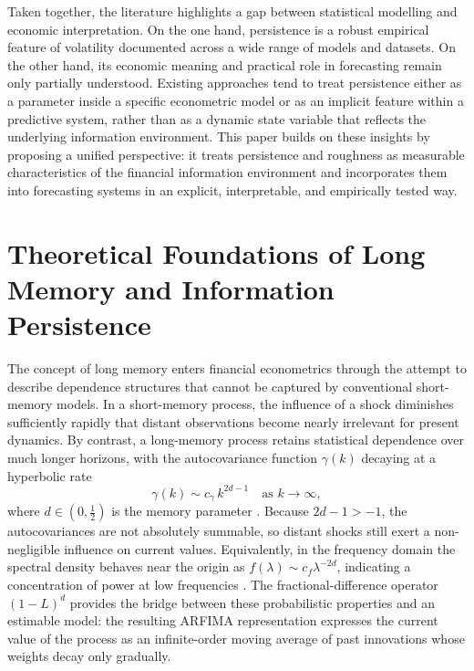 \documentclass[11pt,a4paper]{article}
\begin{document}
Taken together, the literature highlights a gap between statistical
modelling and economic interpretation. On the one hand, persistence is a
robust empirical feature of volatility documented across a wide range of
models and datasets. On the other hand, its economic meaning and practical
role in forecasting remain only partially understood. Existing approaches
tend to treat persistence either as a parameter inside a specific
econometric model or as an implicit feature within a predictive system,
rather than as a dynamic state variable that reflects the underlying
information environment. This paper builds on these insights by proposing
a unified perspective: it treats persistence and roughness as measurable
characteristics of the financial information environment and incorporates
them into forecasting systems in an explicit, interpretable, and
empirically tested way.

\section{Theoretical Foundations of Long Memory and Information
Persistence}
\label{sec:theory}

The concept of long memory enters financial econometrics through the
attempt to describe dependence structures that cannot be captured by
conventional short-memory models. In a short-memory process, the influence
of a shock diminishes sufficiently rapidly that distant observations become
nearly irrelevant for present dynamics. By contrast, a long-memory process
retains statistical dependence over much longer horizons, with the
autocovariance function $\gamma(k)$ decaying at a hyperbolic rate
\begin{equation}
  \gamma(k) \sim c_\gamma\, k^{2d-1}\quad \text{as } k\to\infty,
  \label{eq:lm-autocov}
\end{equation}
where $d\in(0, \tfrac12)$ is the memory parameter
\citep{granger1980introduction,hosking1981fractional}. Because $2d-1>-1$,
the autocovariances are not absolutely summable, so distant shocks still
exert a non-negligible influence on current values. Equivalently, in the
frequency domain the spectral density behaves near the origin as
$f(\lambda)\sim c_f \lambda^{-2d}$, indicating a concentration of power at
low frequencies \citep{robinson1995gaussian}. The fractional-difference
operator $(1-L)^d$ provides the bridge between these probabilistic
properties and an estimable model: the resulting ARFIMA representation
expresses the current value of the process as an infinite-order moving
average of past innovations whose weights decay only gradually.
\end{document}
